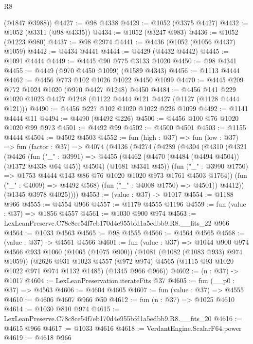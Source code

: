 \begin{lexlean}{R8}
\begin{coremodule}
      (@1847 @3988))
@4427 := @98 @4338
@4429 := @1052 (@3375 @4427)
@4432 := @1052 (@3311 (@98 @4335))
@4434 := @1052 (@3247 @983)
@4436 := @1052 (@1223 @980)
@4437 := @98 @2974
@4441 := @4436 (@1052 (@1056 @4437) @1059)
@4442 := @4434 @4441
@4444 := @4429 (@4432 @4442)
@4445 := @1091 @4444
@4449 := @4445 @90 @775 @3133 @1020
@4450 := @98 @4341
@4455 := @4449 (@970 @4450 @1099) (@1589 @4343)
@4456 := @1113 @4444
@4462 := @4456 @773 @102 @1026 @1022 @4450 @1099
@4470 := @4445 @209 @772 @1024 @1020 (@970 @4427 @1248) @4450
@4484 := @4456 @141 @229 @1020 @1023 @4427 @1248 (@1122 @4444 @121 @4427 (@1127 (@1128 @4444 @121)))
@4490 := @4456 @227 @102 @1020 @1022 @226 @1099
@4492 := @1141 @4444 @11
@4494 := @4490 (@4492 @226)
@4500 := @4456 @100 @76 @1020 @1020 @99 @973
@4501 := @4492 @99
@4502 := @4500 @4501
@4503 := @1155 @4444
@4504 := @4502 @4503
@4552 := fun (high : @37) =>
  fun (low : @37) =>
  fun (factor : @37) =>
  @4074
    (@4136
      (@4274
        (@4289
          (@4304
            (@4310
              (@4321
                (@4426
                  (fun ("_" : @3991) =>
                  @4455
                    (@4462 (@4470 (@4484 (@4494 @4504)) (@1372 @4338 @64 @45)) @4504)
                    (@1681 @4341 @45))
                  (fun ("_" : @3990 @1750) =>
                  @1753 @4444 @143 @86 @76 @1020 @1020 @973 @1761 @4503 @1764))
                (fun ("_" : @4009) => @4492 @568)
                (fun ("_" : @4008 @1750) => @4501))
              @4412))
          (@1345 @3978 @4025))))
@4553 := (value : @37) -> @1017
@4554 := @1188 @966
@4555 := @4554 @966
@4557 := @1179 @4555 @1196
@4559 := fun (value : @37) => @1856 @4557
@4561 := @1030 @900 @974
@4563 := LexLeanPreserve.C78c8ce54f7eb170d4e955bfd1a5edbb9.R8.__fits_22 @966
@4564 := @1033 @4563
@4565 := @98 @4555
@4566 := @4564 @4565
@4568 := (value : @37) -> @4561 @4566
@4601 := fun (value : @37) =>
  @1044
    @900
    @974
    @4566
    @933
    @1060
    (@1065 (@1075 @900))
    (@1081 (@1082 (@1083 @933) @974 @1059))
    (@2626
      @931
      @1023
      @4557
      (@972 @974)
      @4565
      (@1115 @93 @1020 @1022 @971 @974 @1132 @1485)
      (@1345 @966 @966))
@4602 := (n : @37) -> @1017
@4604 := LexLeanPreservation.iterateFits @37
@4605 := fun (__p0 : @37) => @4563
@4606 := @4604 @4605
@4607 := fun (value : @37) => @4555
@4610 := @4606 @4607 @966 @50
@4612 := fun (n : @37) => @1025 @4610
@4614 := @1030 @810 @974
@4615 := LexLeanPreserve.C78c8ce54f7eb170d4e955bfd1a5edbb9.R8.__fits_20
@4616 := @4615 @966
@4617 := @1033 @4616
@4618 := VerdantEngine.ScalarF64.power
@4619 := @4618 @966

\end{coremodule}
\end{lexlean}
